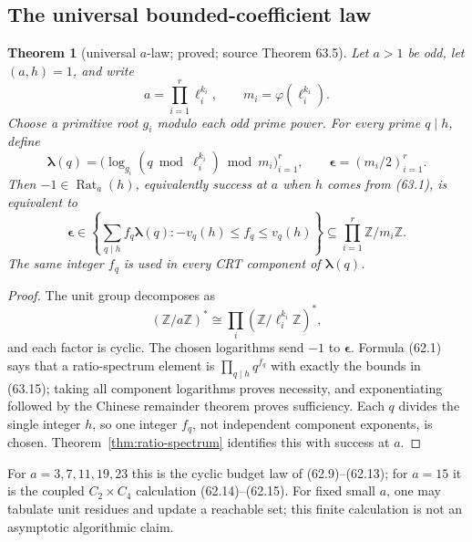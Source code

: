 \documentclass[10pt,reqno]{amsart}
\newtheorem{theorem}{Theorem}[section]
\theoremstyle{definition}
\newcommand{\1}{\mathbf 1}
\begin{document}
\subsection{The universal bounded-coefficient law}
\begin{theorem}[universal $a$-law; proved; source Theorem 63.5]
\label{thm:universal-a-law}
Let $a>1$ be odd, let $(a,h)=1$, and write
\begin{equation}\tag{63.13}
 a=\prod_{i=1}^r\ell_i^{k_i},\qquad m_i=\varphi(\ell_i^{k_i}).
\end{equation}
Choose a primitive root $g_i$ modulo each odd prime power.  For every prime
$q\mid h$, define
\begin{equation}\tag{63.14}
 \boldsymbol\lambda(q)=
  \bigl(\log_{g_i}(q\bmod\ell_i^{k_i})\bmod m_i\bigr)_{i=1}^r,
 \qquad \boldsymbol\epsilon=(m_i/2)_{i=1}^r.
\end{equation}
Then $-1\in\operatorname {Rat}_a(h)$, equivalently success at $a$ when $h$
comes from (63.1), is equivalent to
\begin{equation}\tag{63.15}
 \boxed{\quad
 \boldsymbol\epsilon\in
 \left\{\sum_{q\mid h}f_q\boldsymbol\lambda(q):
            -v_q(h)\leq f_q\leq v_q(h)\right\}
 \subseteq\prod_{i=1}^r\mathbb Z/m_i\mathbb Z.\quad}
\end{equation}
The same integer $f_q$ is used in every CRT component of
$\boldsymbol\lambda(q)$.
\end{theorem}
\begin{proof}
The unit group decomposes as
\begin{equation}\tag{63.16}
 (\mathbb Z/a\mathbb Z)^*\cong
       \prod_i(\mathbb Z/\ell_i^{k_i}\mathbb Z)^*,
\end{equation}
and each factor is cyclic.  The chosen logarithms send $-1$ to
$\boldsymbol\epsilon$.  Formula (62.1) says that a ratio-spectrum element is
$\prod_{q\mid h}q^{f_q}$ with exactly the bounds in (63.15); taking
all component logarithms proves necessity, and exponentiating followed by
the Chinese remainder theorem proves sufficiency.  Each $q$ divides the
single integer $h$, so one integer $f_q$, not independent component
exponents, is chosen.  Theorem~\ref{thm:ratio-spectrum} identifies this with
success at $a$.
\end{proof}
For $a=3,7,11,19,23$ this is the cyclic budget law of (62.9)--(62.13); for
$a=15$ it is the coupled $C_2\times C_4$ calculation (62.14)--(62.15).
For fixed small $a$, one may tabulate unit residues and update a reachable
set; this finite calculation is not an asymptotic algorithmic claim.
\end{document}
